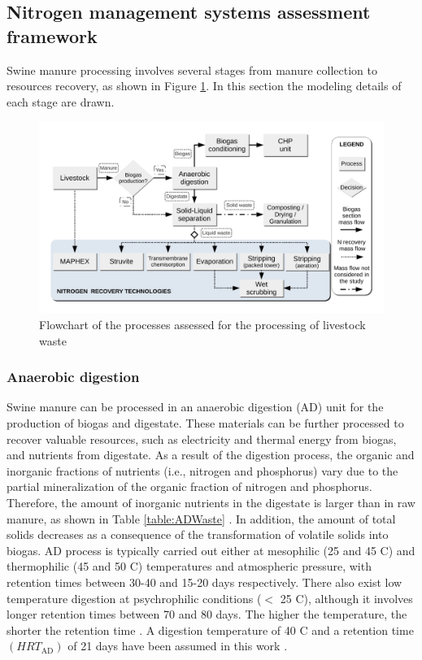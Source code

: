 \begin{refsection}[referencesCh6]
\subsection{Nitrogen management systems assessment framework} \label{section:NitrogenManagModels}
Swine manure processing involves several stages from manure collection to resources recovery, as shown in Figure \ref{fig:techs_diagrams}. In this section the modeling details of each stage are drawn.
\begin{figure}[h]
	\centering
		\includegraphics[width=0.9\linewidth, trim={1cm 1cm 1cm 1cm},clip]{gfx/Chapter6/Process_Flowsheet2.pdf} 
		\caption{Flowchart of the processes assessed for the processing of livestock waste}
		\label{fig:techs_diagrams}
	\end{figure}

\subsubsection{Anaerobic digestion}
Swine manure can be processed in an anaerobic digestion (AD) unit for the production of biogas and digestate. These materials can be further processed to recover valuable resources, such as electricity and thermal energy from biogas, and nutrients from digestate. As a result of the digestion process, the organic and inorganic fractions of nutrients (i.e., nitrogen and phosphorus) vary due to the partial mineralization of the organic fraction of nitrogen and phosphorus. Therefore, the amount of inorganic nutrients in the digestate is larger than in raw manure, as shown in Table \ref{table:ADWaste} \citep{fangueiro2020available}. In addition, the amount of total solids decreases as a consequence of the transformation of volatile solids into biogas. AD process is typically carried out either at mesophilic (25 and 45 \textdegree C) and thermophilic (45 and 50 \textdegree C) temperatures and atmospheric pressure, with retention times between 30-40 and 15-20 days respectively. There also exist low temperature digestion at psychrophilic conditions ($<$ 25 \textdegree C), although it involves longer retention times between 70 and 80 days. The higher the temperature, the shorter the retention time \citep{Seadi2008}. A digestion temperature  of 40 \textdegree C and a retention time $\left( {HRT}_{\text{AD}} \right) $ of 21 days have been assumed in this work \citep{bolzonella2018nutrients}. 


\end{refsection}
